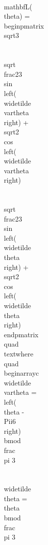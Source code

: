   \\mathbf{L}(\\theta) =
  \\begin{pmatrix}
  \\sqrt{3} \\\\
   \\sqrt{\\frac{2}{3}} \\sin \\left(\\widetilde{\\vartheta}\\right) + \\sqrt{2} \\cos \\left(\\widetilde{\\vartheta}\\right) \\\\  
  \\sqrt{\\frac{2}{3}} \\sin \\left(\\widetilde{\\theta}\\right) + \\sqrt{2} \\cos \\left(\\widetilde{\\theta}\\right) 
  \\end{pmatrix}
  \\quad \\text{where}  \\quad 
  \\begin{array}{c}
  \\widetilde{\\vartheta} = \\left(\\theta - \\Pii{6}\\right) \\bmod \\frac{\\pi }{3} \\\\
  \\widetilde{\\theta} = \\theta  \\bmod \\frac{\\pi }{3} 
